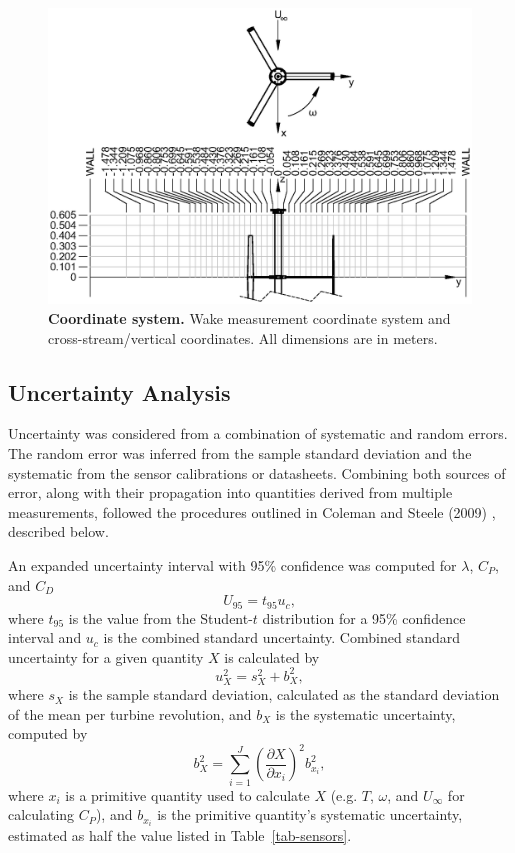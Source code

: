 \documentclass[10pt,letterpaper]{article}
\begin{document}
\begin{figure}[h]
    \includegraphics[width=\textwidth]{figures/turbine_coordinate_system.eps}

    \caption{{\bf Coordinate system.} Wake measurement coordinate system and
    cross-stream/vertical coordinates. All dimensions are in meters.}

    \label{fig:coordinates}
\end{figure}


\subsection*{Uncertainty Analysis}

Uncertainty was considered from a combination of systematic
and random errors. The random error was inferred from the sample standard
deviation and the systematic from the sensor calibrations or datasheets.
Combining both sources of error, along with their propagation into quantities
derived from multiple measurements, followed the procedures outlined in
Coleman and Steele (2009) \cite{ColemanSteele}, described below.

An expanded uncertainty interval with 95\% confidence was computed for
$\lambda$, $C_P$, and $C_D$
\begin{equation}
    U_{95} = t_{95} u_c,
\end{equation}
where $t_{95}$ is the value from the Student-$t$ distribution for a 95\%
confidence interval and $u_c$ is the combined standard uncertainty. Combined
standard uncertainty for a given quantity $X$ is calculated by
\begin{equation}
    u_X^2 = s_X^2 + b_X^2,
\end{equation}
where $s_X$ is the sample standard deviation, calculated as the standard
deviation of the mean per turbine revolution, and $b_X$ is the systematic
uncertainty, computed by
\begin{equation}
    b_{X}^2 = \sum_{i=1}^J \left( \frac{\partial X}{\partial x_i} \right)^2
    b_{x_i}^2,
\end{equation}
where $x_i$ is a primitive quantity used to calculate $X$ (e.g. $T$, $\omega$,
and $U_\infty$ for calculating $C_P$), and $b_{x_i}$ is the primitive quantity's
systematic uncertainty, estimated as half the value listed in
Table~\ref{tab-sensors}.
\end{document}
